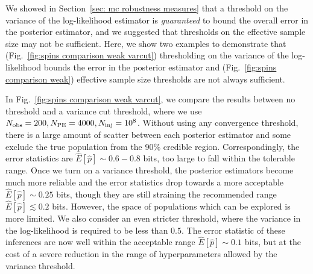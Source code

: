 \documentclass[%
 reprint,
 amsmath,amssymb,
 aps,nofootinbib,nobibnotes,onecolumn,prd
]{revtex4-2}
\begin{document}
We showed in Section~\ref{sec: mc robustness measures} that a threshold on the variance of the log-likelihood estimator is \textit{guaranteed} to bound the overall error in the posterior estimator, and we suggested that thresholds on the effective sample size may not be sufficient. Here, we show two examples to demonstrate that (Fig.~\ref{fig:spins comparison weak varcut}) thresholding on the variance of the log-likelihood bounds the error in the posterior estimator and (Fig.~\ref{fig:spins comparison weak}) effective sample size thresholds are not always sufficient. 

In Fig.~\ref{fig:spins comparison weak varcut}, we compare the results between no threshold and a variance cut threshold, where we use $N_{\rm obs} = 200, N_{\rm PE} = 4000, N_{\rm inj} = 10^8$. Without using any convergence threshold, there is a large amount of scatter between each posterior estimator and some exclude the true population from the 90\% credible region. Correspondingly, the error statistics are $\hat{E}[\hat{p}]\sim 0.6-0.8$ bits, too large to fall within the tolerable range. Once we turn on a variance threshold, the posterior estimators become much more reliable and the error statistics drop towards a more acceptable $\hat{E}[\hat{p}] \sim 0.25$ bits, though they are still straining the recommended range $\hat{E}[\hat{p}] \lesssim0.2$ bits. However, the space of populations which can be explored is more limited. 
We also consider an even stricter threshold, where the variance in the log-likelihood is required to be less than $0.5$. The error statistic of these inferences are now well within the acceptable range $\hat{E}[\hat{p}] \sim 0.1$ bits, but at the cost of a severe reduction in the range of hyperparameters allowed by the variance threshold.
\end{document}

